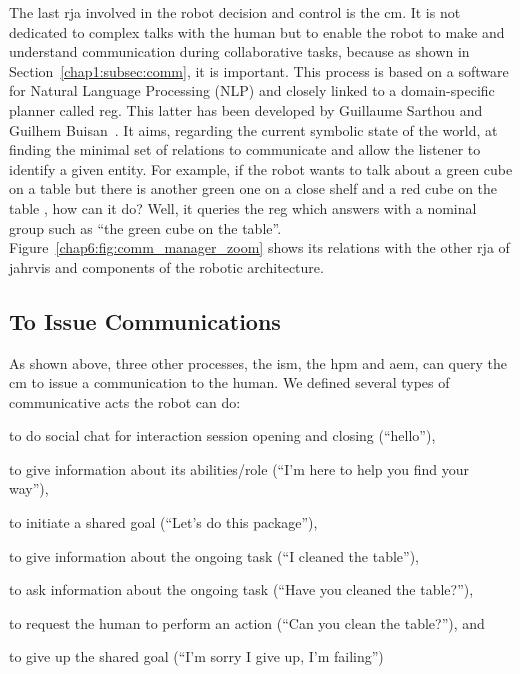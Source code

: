 \documentclass[a4paper,11pt,twoside]{StyleThese}
\begin{document}
The last \acrshort{rja} involved in the robot decision and control is the \acrfull{cm}. It is not dedicated to complex talks with the human but to enable the robot to make and understand communication during collaborative tasks, because as shown in Section~\ref{chap1:subsec:comm}, it is important. This process is based on a software for Natural Language Processing (NLP) and closely linked to a domain-specific planner called \acrfull{reg}. This latter has been developed by Guillaume Sarthou and Guilhem Buisan~\cite{buisan_2020_efficient}. It aims, regarding the current symbolic state of the world, at finding the minimal set of relations to communicate and allow the listener to identify a given entity. For example, if the robot wants to talk about a green cube on a table but there is another green one on a close shelf and a red cube on the table , how can it do? Well, it queries the \acrshort{reg} which answers with a nominal group such as ``the green cube on the table''. Figure~\ref{chap6:fig:comm_manager_zoom} shows its relations with the other \acrshort{rja} of \acrshort{jahrvis} and components of the robotic architecture.


\subsection{To  Issue Communications}
As shown above, three other processes, the \acrlong{ism}, the \acrlong{hpm} and \acrlong{aem}, can query the \acrshort{cm} to issue a communication to the human. We defined several types of communicative acts the robot can do:
\begin{bulletList}
	\item to do social chat for interaction session opening and closing (\eg ``hello''),
	\item to give information about its abilities/role (\eg ``I'm here to help you find your way''),
	\item to initiate a shared goal (\eg ``Let's do this package''),
	\item to give information about the ongoing task (\eg ``I cleaned the table''),\label{chap6:emum:comm1}
	\item to ask information about the ongoing task (\eg ``Have you cleaned the table?''),
	\item to request the human to perform an action (\eg ``Can you clean the table?''), and\label{chap6:emum:comm2}
	\item to give up the shared goal (\eg ``I'm sorry I give up, I'm failing'')
\end{bulletList}
\end{document}
